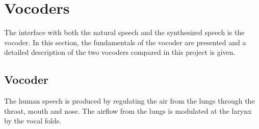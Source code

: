 \section{Vocoders}
\label{vocoders}
The interface with both the natural speech and the synthesized speech is the vocoder. In this section, the fundamentals of the vocoder are presented and a detailed description of the two vocoders compared in this project is given.

\subsection{Vocoder}
\label{vocoders_vocoder}
The human speech is produced by regulating the air from the lungs through the throat, mouth and nose. The airflow from the lungs is modulated at the larynx by the vocal folds. 